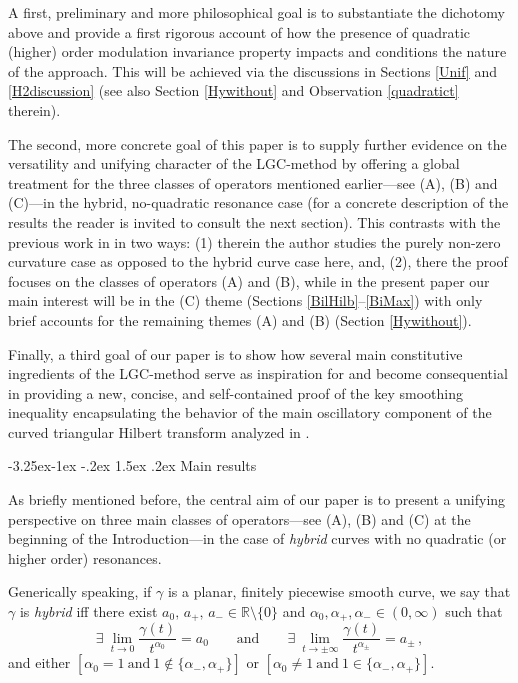 \documentclass[a4paper,reqno]{amsart}
\makeatletter
\def\subsection{\@startsection{subsection}{2}{\z@}%
	{-3.25ex\@plus -1ex \@minus -.2ex}%
	{1.5ex \@plus .2ex}%
	{\normalfont\bfseries\boldmath}}
\numberwithin{equation}{section}
\theoremstyle{definition}
\newcommand{\R}{\mathbb{R}}
\def\a{\alpha}
\def\g{\gamma}
\makeatother
\begin{document}
A first, preliminary and more philosophical goal is to substantiate the dichotomy above and provide a first rigorous account of how the presence of quadratic (higher) order modulation invariance property impacts and conditions the nature of the approach. This will be achieved via the discussions in Sections \ref{Unif} and \ref{H2discussion} (see also Section \ref{Hywithout} and Observation \ref{quadratict} therein).

The second, more concrete goal of this paper is to supply further evidence on the versatility and unifying character of the LGC-method by offering a global treatment for the three classes of operators mentioned earlier---see (A), (B) and (C)---in the hybrid, no-quadratic resonance case (for a concrete description of the results the reader is invited to consult the next section). This contrasts with the previous work in  \cite{Lie19} in two ways: (1) therein the author studies the purely non-zero curvature case as opposed to the hybrid curve case here, and, (2), there the proof focuses on the classes of operators (A) and (B), while in the present paper our main interest will be in the (C) theme (Sections \ref{BilHilb}--\ref{BiMax}) with only brief accounts for the remaining themes (A) and (B) (Section \ref{Hywithout}).

Finally, a third goal of our paper is to show how several main constitutive ingredients of the LGC-method serve as inspiration for and become consequential in providing a new, concise, and self-contained proof of the key smoothing inequality encapsulating the behavior of the main oscillatory component of the curved triangular Hilbert transform analyzed in \cite{CDR20}.


\subsection{Main results}


As briefly mentioned before, the central aim of our paper is to present a unifying perspective on three main classes of operators---see (A), (B) and (C) at the beginning of the Introduction---in the case of \emph{hybrid} curves with no quadratic (or higher order) resonances.

Generically speaking, if $\g$ is a planar, finitely piecewise smooth curve, we say that $\g$ is \emph{hybrid} iff there exist $a_0,\,a_{+},\,a_{-}\in \R\setminus\{0\}$ and $\a_0,\a_{+},\a_{-}\in (0,\infty)$ such that
	\begin{equation}\label{asym}
\exists\:\lim_{t\rightarrow 0}\frac{\g(t)}{t^{\a_0}}=a_0\qquad\textrm{and}\qquad \exists\:\lim_{t\rightarrow \pm\infty}\frac{\g(t)}{t^{\a_{\pm}}}=a_{\pm}\,,
	\end{equation}
and either $[\a_0=1\:\textrm{and}\:1\not\in\{\a_{-},\a_{+}\}]$ or $[\a_0\not=1\:\textrm{and}\:1\in\{\a_{-},\a_{+}\}]$.
\end{document}
